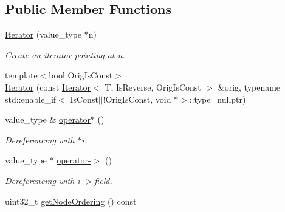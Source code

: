 \subsection*{Public Member Functions}
\begin{DoxyCompactItemize}
\item 
\mbox{\label{classglow_1_1tagged__list__details_1_1_iterator_a3ebfc8cff52ed850932de47ab93a2767}} 
\hyperlink{classglow_1_1tagged__list__details_1_1_iterator_a3ebfc8cff52ed850932de47ab93a2767}{Iterator} (value\+\_\+type $\ast$n)
\begin{DoxyCompactList}\small\item\em Create an iterator pointing at n. \end{DoxyCompactList}\item 
{\footnotesize template$<$bool Orig\+Is\+Const$>$ }\\\hyperlink{classglow_1_1tagged__list__details_1_1_iterator_a011e03d00ac0a027f807f7524f94cda8}{Iterator} (const \hyperlink{classglow_1_1tagged__list__details_1_1_iterator}{Iterator}$<$ T, Is\+Reverse, Orig\+Is\+Const $>$ \&orig, typename std\+::enable\+\_\+if$<$ Is\+Const$\vert$$\vert$!Orig\+Is\+Const, void $\ast$$>$\+::type=nullptr)
\item 
\mbox{\label{classglow_1_1tagged__list__details_1_1_iterator_a9156203f70f98d9d72d609b23a0d81c4}} 
value\+\_\+type \& \hyperlink{classglow_1_1tagged__list__details_1_1_iterator_a9156203f70f98d9d72d609b23a0d81c4}{operator$\ast$} ()
\begin{DoxyCompactList}\small\item\em Dereferencing with {\ttfamily $\ast$i}. \end{DoxyCompactList}\item 
\mbox{\label{classglow_1_1tagged__list__details_1_1_iterator_a2c41e3f79d5ea79b3bc47d4a2d9d2b9e}} 
value\+\_\+type $\ast$ \hyperlink{classglow_1_1tagged__list__details_1_1_iterator_a2c41e3f79d5ea79b3bc47d4a2d9d2b9e}{operator-\/$>$} ()
\begin{DoxyCompactList}\small\item\em Dereferencing with {\ttfamily i-\/$>$field}. \end{DoxyCompactList}\item 
uint32\+\_\+t \hyperlink{classglow_1_1tagged__list__details_1_1_iterator_a582ecf91ea38bfe45e5dd09cc255acfc}{get\+Node\+Ordering} () const

\end{DoxyCompactItemize}
